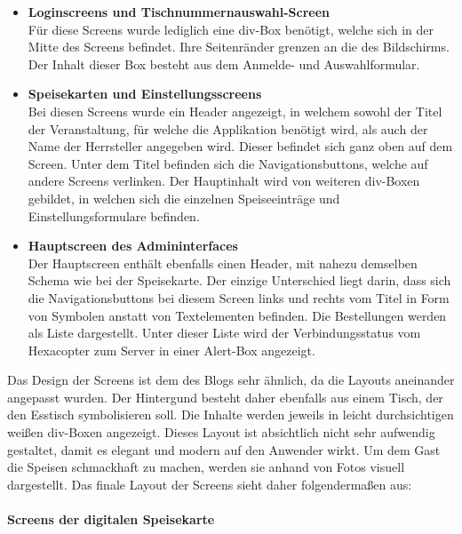 \begin{itemize}
    \item \textbf{Loginscreens und Tischnummernauswahl-Screen}\\  
Für diese Screens wurde lediglich eine div-Box benötigt, welche sich in der Mitte des Screens befindet. Ihre Seitenränder grenzen an die des Bildschirms. Der Inhalt dieser Box besteht aus dem Anmelde- und Auswahlformular.
	\item \textbf{Speisekarten und Einstellungsscreens}\\
Bei diesen Screens wurde ein Header angezeigt, in welchem sowohl der Titel der Veranstaltung, für welche die Applikation benötigt wird, als auch der Name der Herrsteller angegeben wird. Dieser befindet sich ganz oben auf dem Screen. Unter dem Titel befinden sich die Navigationsbuttons, welche auf andere Screens verlinken. Der Hauptinhalt wird von weiteren div-Boxen gebildet, in welchen sich die einzelnen Speiseeinträge und Einstellungsformulare befinden. 
    \item \textbf{Hauptscreen des Admininterfaces}\\ 
Der Hauptscreen enthält ebenfalls einen Header, mit nahezu demselben Schema wie bei der Speisekarte. Der einzige Unterschied liegt darin, dass sich die Navigationsbuttons bei diesem Screen links und rechts vom Titel in Form von Symbolen anstatt von Textelementen befinden. Die Bestellungen werden als Liste dargestellt. Unter dieser Liste wird der Verbindungsstatus vom Hexacopter zum Server in einer Alert-Box angezeigt.
  \end{itemize}
Das Design der Screens ist dem des Blogs sehr ähnlich, da die Layouts aneinander angepasst wurden. Der Hintergund besteht daher ebenfalls aus einem Tisch, der den Esstisch symbolisieren soll. Die Inhalte werden jeweils in leicht durchsichtigen weißen div-Boxen angezeigt. Dieses Layout ist absichtlich nicht sehr aufwendig gestaltet, damit es elegant und modern auf den Anwender wirkt.
Um dem Gast die Speisen schmackhaft zu machen, werden sie anhand von Fotos visuell dargestellt.
Das finale Layout der Screens sieht daher folgendermaßen aus:\\ 
\\ 
\textbf{Screens der digitalen Speisekarte}
